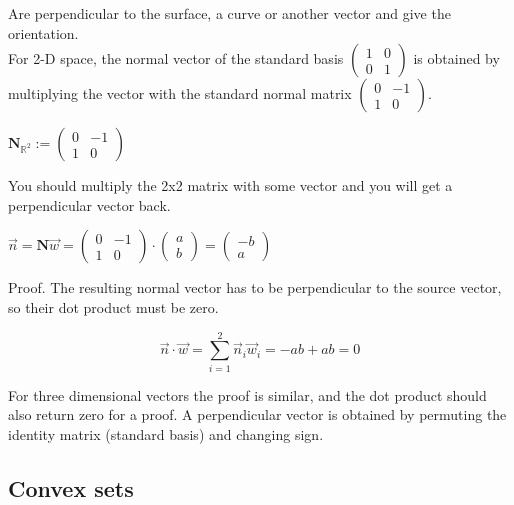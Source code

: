 \documentclass[a4paper]{article}
\begin{document}
Are perpendicular to the surface, a curve or another vector and give the orientation.\\

For 2-D space, the normal vector of the standard basis $\begin{pmatrix}1&0\\0&1\end{pmatrix}$ is obtained by multiplying the vector with the standard normal matrix $\begin{pmatrix}0 & -1 \\ 1 & 0\end{pmatrix}$.\\

\begin{center}
$\boldsymbol{N}_{\mathbb{R}^{2}} := \begin{pmatrix}0 & -1 \\ 1 & 0\end{pmatrix}$\\
\end{center}

You should multiply the 2x2 matrix with some vector and you will get a perpendicular vector back.

\begin{center}
$\vec{n} = \boldsymbol{N}\vec{w} = \begin{pmatrix}0 & -1 \\ 1 & 0\end{pmatrix} \cdot \begin{pmatrix}a\\b\end{pmatrix} = \begin{pmatrix}-b\\a\end{pmatrix}$
\end{center}

Proof. The resulting normal vector has to be perpendicular to the source vector, so their dot product must be zero.

\begin{displaymath}
\vec{n} \cdot \vec{w} = \sum_{i=1}^{2}\vec{n}_{i}\vec{w}_i = -ab + ab = 0
\end{displaymath}

For three dimensional vectors the proof is similar, and the dot product should also return zero for a proof. A perpendicular vector is obtained by permuting the identity matrix (standard basis) and changing sign.



\subsection{Convex sets}
\end{document}
